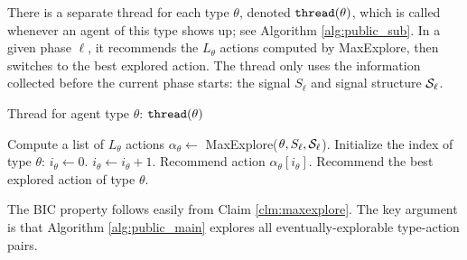 There is a separate thread for each type $\theta$, denoted $\thread(\theta)$,  which is called whenever an agent of this type shows up; see Algorithm \ref{alg:public_sub}. In a given phase $\ell$, it recommends the $L_{\theta}$ actions computed by MaxExplore, then switches to the best explored action. The thread only uses the information collected before the current phase starts: the signal $S_\ell$ and signal structure $\S_\ell$.

 \begin{algorithm}[h]
    \caption{Thread for agent type $\theta$: $\thread(\theta)$ }
    	\label{alg:public_sub}
    \begin{algorithmic}[1]
			\STATE Compute a list of $L_{\theta}$ actions $\alpha_{\theta} \leftarrow $ MaxExplore($\theta, S_\ell, \S_\ell$).
			\STATE Initialize the index of type $\theta$: $i_{\theta} \leftarrow 0$.
		\ENDIF
		\STATE $i_{\theta} \leftarrow i_{\theta} + 1$.
			\STATE Recommend action $\alpha_{\theta} [i_{\theta}]$.
		\ELSE
			\STATE Recommend the best explored action of type $\theta$.
		\ENDIF
     \end{algorithmic}
\end{algorithm}

The BIC property follows easily from Claim \ref{clm:maxexplore}. The key argument is that Algorithm \ref{alg:public_main} explores all  eventually-explorable type-action pairs.




